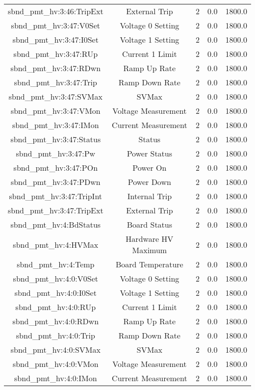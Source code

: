 \begin{table}[ptb]
\begin{tabular}{c | c c c c}
sbnd_pmt_hv:3:46:TripExt & External Trip & 2 & 0.0 & 1800.0\\ 
sbnd_pmt_hv:3:47:V0Set & Voltage 0 Setting & 2 & 0.0 & 1800.0\\ 
sbnd_pmt_hv:3:47:I0Set & Voltage 1 Setting & 2 & 0.0 & 1800.0\\ 
sbnd_pmt_hv:3:47:RUp & Current 1 Limit & 2 & 0.0 & 1800.0\\ 
sbnd_pmt_hv:3:47:RDwn & Ramp Up Rate & 2 & 0.0 & 1800.0\\ 
sbnd_pmt_hv:3:47:Trip & Ramp Down Rate & 2 & 0.0 & 1800.0\\ 
sbnd_pmt_hv:3:47:SVMax & SVMax & 2 & 0.0 & 1800.0\\ 
sbnd_pmt_hv:3:47:VMon & Voltage Measurement & 2 & 0.0 & 1800.0\\ 
sbnd_pmt_hv:3:47:IMon & Current Measurement & 2 & 0.0 & 1800.0\\ 
sbnd_pmt_hv:3:47:Status & Status & 2 & 0.0 & 1800.0\\ 
sbnd_pmt_hv:3:47:Pw & Power Status & 2 & 0.0 & 1800.0\\ 
sbnd_pmt_hv:3:47:POn & Power On & 2 & 0.0 & 1800.0\\ 
sbnd_pmt_hv:3:47:PDwn & Power Down & 2 & 0.0 & 1800.0\\ 
sbnd_pmt_hv:3:47:TripInt & Internal Trip & 2 & 0.0 & 1800.0\\ 
sbnd_pmt_hv:3:47:TripExt & External Trip & 2 & 0.0 & 1800.0\\ 
sbnd_pmt_hv:4:BdStatus & Board Status & 2 & 0.0 & 1800.0\\ 
sbnd_pmt_hv:4:HVMax & Hardware HV Maximum & 2 & 0.0 & 1800.0\\ 
sbnd_pmt_hv:4:Temp & Board Temperature & 2 & 0.0 & 1800.0\\ 
sbnd_pmt_hv:4:0:V0Set & Voltage 0 Setting & 2 & 0.0 & 1800.0\\ 
sbnd_pmt_hv:4:0:I0Set & Voltage 1 Setting & 2 & 0.0 & 1800.0\\ 
sbnd_pmt_hv:4:0:RUp & Current 1 Limit & 2 & 0.0 & 1800.0\\ 
sbnd_pmt_hv:4:0:RDwn & Ramp Up Rate & 2 & 0.0 & 1800.0\\ 
sbnd_pmt_hv:4:0:Trip & Ramp Down Rate & 2 & 0.0 & 1800.0\\ 
sbnd_pmt_hv:4:0:SVMax & SVMax & 2 & 0.0 & 1800.0\\ 
sbnd_pmt_hv:4:0:VMon & Voltage Measurement & 2 & 0.0 & 1800.0\\ 
sbnd_pmt_hv:4:0:IMon & Current Measurement & 2 & 0.0 & 1800.0\\ 

\end{tabular}
\end{table}
